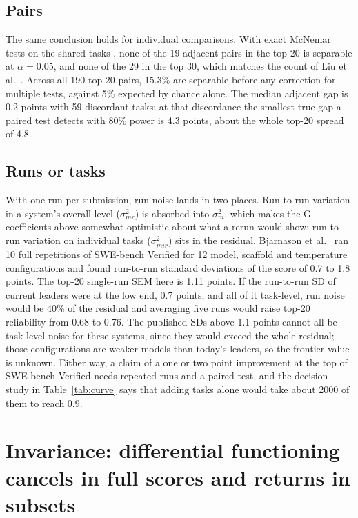 \documentclass[11pt]{article}
\begin{document}
\subsection{Pairs}

The same conclusion holds for individual comparisons. With exact McNemar tests on the shared tasks \citep{mcnemar1947note}, none of the 19 adjacent pairs in the top 20 is separable at $\alpha = 0.05$, and none of the 29 in the top 30, which matches the count of Liu et al.\ \citep{liu2026converged}. Across all 190 top-20 pairs, 15.3\% are separable before any correction for multiple tests, against 5\% expected by chance alone. The median adjacent gap is 0.2 points with 59 discordant tasks; at that discordance the smallest true gap a paired test detects with 80\% power is 4.3 points, about the whole top-20 spread of 4.8.

\subsection{Runs or tasks}

With one run per submission, run noise lands in two places. Run-to-run variation in a system's overall level ($\sigma^2_{mr}$) is absorbed into $\sigma^2_m$, which makes the G coefficients above somewhat optimistic about what a rerun would show; run-to-run variation on individual tasks ($\sigma^2_{mir}$) sits in the residual. Bjarnason et al.\ \citep{bjarnason2026randomness} ran 10 full repetitions of SWE-bench Verified for 12 model, scaffold and temperature configurations and found run-to-run standard deviations of the score of 0.7 to 1.8 points. The top-20 single-run SEM here is 1.11 points. If the run-to-run SD of current leaders were at the low end, 0.7 points, and all of it task-level, run noise would be 40\% of the residual and averaging five runs would raise top-20 reliability from 0.68 to 0.76. The published SDs above 1.1 points cannot all be task-level noise for these systems, since they would exceed the whole residual; those configurations are weaker models than today's leaders, so the frontier value is unknown. Either way, a claim of a one or two point improvement at the top of SWE-bench Verified needs repeated runs and a paired test, and the decision study in Table~\ref{tab:curve} says that adding tasks alone would take about 2000 of them to reach 0.9.

\section{Invariance: differential functioning cancels in full scores and returns in subsets}
\end{document}
